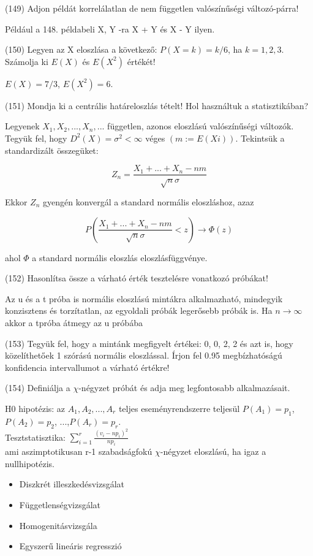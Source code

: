 \documentclass[12p]{article}
\begin{document}
(149) Adjon példát korrelálatlan de nem független valószínűségi változó-párra!

Például a 148. példabeli X, Y -ra X + Y és X - Y ilyen.

(150) Legyen az X eloszlása a következő: $P(X = k) = k/6$, ha $k = 1, 2, 3$. Számolja ki $E(X)$ és $E(X^2)$ értékét!

$E(X) = 7/3$, $E(X^2) = 6$.

(151) Mondja ki a centrális határeloszlás tételt! Hol használtuk a statisztikában?

Legyenek $X_1 , X_2 ,..., X_n ,...$ független, azonos eloszlású valószínűségi változók. Tegyük fel, hogy $D^2(X) = \sigma^2 < \infty$ véges $(m:=E(Xi))$. Tekintsük a standardizált összegüket:

$$Z_n = \frac{X_1 + ... + X_n -nm}{\sqrt{n}\sigma}$$

Ekkor $Z_n$ gyengén konvergál a standard normális eloszláshoz,
azaz

$$P(\frac{X_1 + ... + X_n - nm}{\sqrt{n}\sigma} < z) \rightarrow \Phi(z)$$

ahol $\Phi$ a standard normális eloszlás eloszlásfüggvénye.

(152) Hasonlítsa össze a várható érték tesztelésre vonatkozó próbákat!

Az u és a t próba is normális eloszlású mintákra alkalmazható, mindegyik konzisztens és torzítatlan, az egyoldali próbák legerősebb próbák is. Ha $n \rightarrow \infty$ akkor a tpróba átmegy az u próbába

(153) Tegyük fel, hogy a mintánk megfigyelt értékei: 0, 0, 2, 2 és azt is, hogy közelíthetőek 1 szórású normális eloszlással. Írjon fel 0.95 megbízhatóságú konfidencia intervallumot a várható értékre!

(154) Definiálja a $\chi$-négyzet próbát és adja meg legfontosabb alkalmazásait.

H0 hipotézis: az $A_1, A_2, ..., A_r$ teljes eseményrendszerre teljesül $P(A_1)=p_1$, $P(A_2)=p_2$, ...,$P(A_r)=p_r$.\\
Tesztstatisztika: $\displaystyle{ \sum^r_{i=1} \frac{(v_i - np_i)^2}{np_i}}$\\
ami aszimptotikusan r-1 szabadságfokú $\chi$-négyzet eloszlású, ha igaz a nullhipotézis. 

\begin{itemize}
	\item Diszkrét illeszkedésvizsgálat
	\item Függetlenségvizsgálat
	\item Homogenitásvizsgála
	\item Egyszerű lineáris regresszió
\end{itemize}
\end{document}

